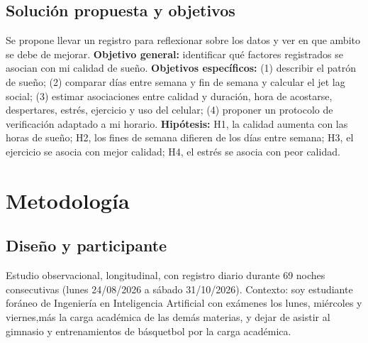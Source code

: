 \documentclass[conference]{IEEEtran}
\begin{document}
\subsection{Solución propuesta y objetivos}
Se propone llevar un registro para reflexionar sobre los datos y ver en que ambito se debe de mejorar. \textbf{Objetivo general:} identificar qué factores registrados se asocian con mi calidad de sueño. \textbf{Objetivos específicos:} (1) describir el patrón de sueño; (2) comparar días entre semana y fin de semana y calcular el jet lag social; (3) estimar asociaciones entre calidad y duración, hora de acostarse, despertares, estrés, ejercicio y uso del celular; (4) proponer un protocolo de verificación adaptado a mi horario. \textbf{Hipótesis:} H1, la calidad aumenta con las horas de sueño; H2, los fines de semana difieren de los días entre semana; H3, el ejercicio se asocia con mejor calidad; H4, el estrés se asocia con peor calidad.

\section{Metodología}

\subsection{Diseño y participante}
Estudio observacional, longitudinal, con registro diario durante 69 noches consecutivas (lunes 24/08/2026 a sábado 31/10/2026). Contexto: soy estudiante foráneo de Ingeniería en Inteligencia Artificial con exámenes los lunes, miércoles y viernes,más la carga académica de las demás  materias, y dejar de asistir al gimnasio y entrenamientos de básquetbol por la carga académica.
\end{document}
